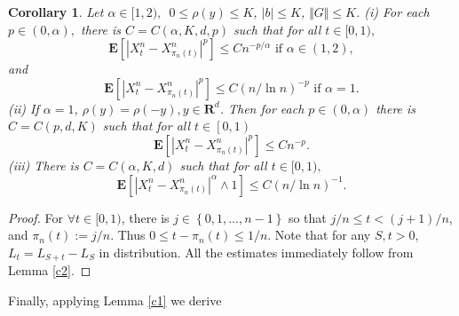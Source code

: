 \documentclass[11pt]{amsart}
\theoremstyle{plain}
\newtheorem{corollary}{Corollary}
\numberwithin{equation}{section}
\begin{document}
\begin{corollary}
\label{co1}Let $\alpha \in \lbrack 1,2),$~$0\leq \rho \left( y\right) \leq K$, $\left\vert b\right\vert \leq K$, $\Vert G\Vert \leq K$.\newline
(i) For each $p\in (0,\alpha ),$ there is $C=C\left( \alpha ,K,d,p\right) $
such that for all $t\in \lbrack 0,1),$ 
\begin{equation*}
\mathbf{E}\left[ \left\vert X_{t}^{n}-X_{\pi _{n}\left( t\right)
}^{n}\right\vert ^{p}\right] \leq Cn^{-p/\alpha }\text{ if }\alpha \in
\left( 1,2\right) ,
\end{equation*}and\begin{equation*}
\mathbf{E}\left[ \left\vert X_{t}^{n}-X_{\pi _{n}\left( t\right)
}^{n}\right\vert ^{p}\right] \leq C\left( n/\ln n\right) ^{-p}\text{ if }\alpha =1.
\end{equation*}(ii) If $\alpha =1$, $\rho \left( y\right) =\rho \left( -y\right) ,y\in 
\mathbf{R}^{d}$. Then for each $p\in\left( 0,\alpha\right)$ there is $C=C\left( p,d,K\right) $ such that for all $t\in \left[ 0,1\right) $ 
\begin{equation*}
\mathbf{E}\left[ \left\vert X_{t}^{n}-X_{\pi _{n}\left( t\right)
}^{n}\right\vert ^{p}\right] \leq Cn^{-p} .
\end{equation*}
(iii) There is $C=C\left( \alpha ,K,d\right) $ such that for all $t\in
\lbrack 0,1),$ 
\begin{equation*}
\mathbf{E}\left[ \left\vert X_{t}^{n}-X_{\pi _{n}\left( t\right)
}^{n}\right\vert ^{\alpha }\wedge 1\right] \leq C\left( n/\ln n\right) ^{-1}.
\end{equation*}
\end{corollary}

\begin{proof}
For $\forall t\in \lbrack 0,1)$, there is $j\in \left\{ 0,1,\ldots
,n-1\right\} $ so that $j/n\leq t<(j+1)/n$, and $\pi _{n}\left( t\right)
:=j/n$. Thus $0\leq t-\pi _{n}\left( t\right) \leq 1/n$. Note that for any $S,t>0$, $L_{t}=L_{S+t}-L_{S}$ in distribution. All the estimates immediately
follow from Lemma \ref{c2}.
\end{proof}

Finally, applying Lemma \ref{c1} we derive
\end{document}
